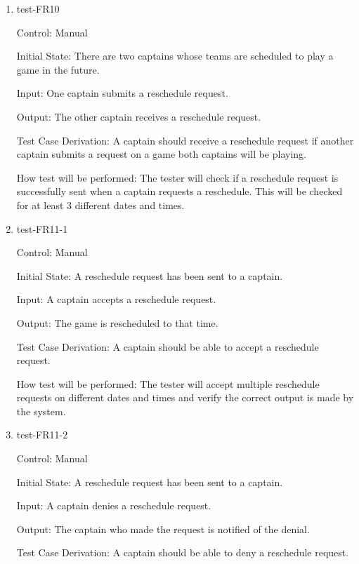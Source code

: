 \documentclass[12pt, titlepage]{article}
\begin{document}
\begin{enumerate}

  \item{test-FR10\\}

  Control: Manual

  Initial State: There are two captains whose teams are scheduled to play a
  game in the future.

  Input: One captain submits a reschedule request.

  Output: The other captain receives a reschedule request.

  Test Case Derivation: A captain should receive a reschedule request if another
  captain submits a request on a game both captains will be playing.

  How test will be performed: The tester will check if a reschedule request is
  successfully sent when a captain requests a reschedule. This will be checked
  for at least 3 different dates and times.

  \item{test-FR11-1\\}

  Control: Manual

  Initial State: A reschedule request has been sent to a captain.

  Input: A captain accepts a reschedule request.

  Output: The game is rescheduled to that time.

  Test Case Derivation: A captain should be able to accept a reschedule
  request.

  How test will be performed: The tester will accept multiple reschedule
  requests on different dates and times and verify the correct output is made by
  the system.

  \item{test-FR11-2\\}

  Control: Manual

  Initial State: A reschedule request has been sent to a captain.

  Input: A captain denies a reschedule request.

  Output: The captain who made the request is notified of the denial.

  Test Case Derivation: A captain should be able to deny a reschedule
  request.


\end{enumerate}
\end{document}
